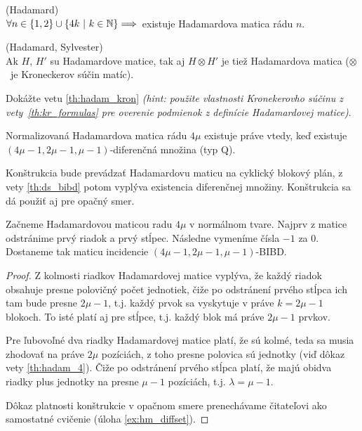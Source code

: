 \begin{hypothesis}{(Hadamard)}\\
$\forall n \in \left\{1, 2\right\} \cup \left\{4k ~|~ k \in \mathbb{N}\right\} \Longrightarrow$~existuje Hadamardova matica rádu $n$. 
\end{hypothesis}


\begin{theorem}{(Hadamard, Sylvester)}\\
\label{th:hadam_kron}
Ak $H$, $H'$ su Hadamardove matice, tak aj $H \otimes H'$ je tiež Hadamardova matica ($\otimes$~je Kroneckerov súčin matíc).
\end{theorem}

\begin{exercise}
Dokážte vetu \ref{th:hadam_kron} \emph{(hint: použite vlastnosti Kronekerovho súčinu z vety~\ref{th:kr_formulas} pre overenie podmienok z definície Hadamardovej matice)}.
\end{exercise}

\begin{theorem}
\label{th:hm_diffset}
Normalizovaná Hadamardova matica rádu $4\mu$ existuje práve vtedy, keď existuje $(4\mu-1, 2\mu-1, \mu-1)$-diferenčná množina (typ Q). 
\end{theorem}
\begin{construction}
Konštrukcia bude prevádzať Hadamardovu maticu na cyklický blokový plán, z vety \ref{th:ds_bibd} potom vyplýva existencia diferenčnej množiny. Konštrukcia sa dá použiť aj pre opačný smer.

Začneme Hadamardovou maticou radu $4\mu$ v normálnom tvare. 
Najprv z matice odstránime prvý riadok a prvý stĺpec.
Následne vymeníme čísla $-1$ za $0$.
Dostaneme tak maticu incidencie $(4\mu - 1, 2\mu - 1, \mu -1)$-BIBD.
\end{construction}
\begin{proof}
Z kolmosti riadkov Hadamardovej matice vyplýva, že každý riadok obsahuje presne polovičný počet jednotiek, čiže po odstránení prvého stĺpca ich tam bude presne $2\mu - 1$, t.j. každý prvok sa vyskytuje v práve $k = 2\mu - 1$ blokoch. To isté platí aj pre stĺpce, t.j. každý blok má práve $2\mu - 1$ prvkov.

Pre ľubovoľné dva riadky Hadamardovej matice platí, že sú kolmé, teda sa musia zhodovať na práve $2\mu$ pozíciách, z toho presne polovica sú jednotky (viď dôkaz vety \ref{th:hadam_4}). Čiže po odstránení prvého stĺpca platí, že majú obidva riadky plus jednotky na presne $\mu - 1$ pozíciách, t.j. $\lambda = \mu - 1$.

Dôkaz platnosti konštrukcie v opačnom smere prenechávame čitateľovi ako samostatné cvičenie (úloha \ref{ex:hm_diffset}).
\end{proof}

